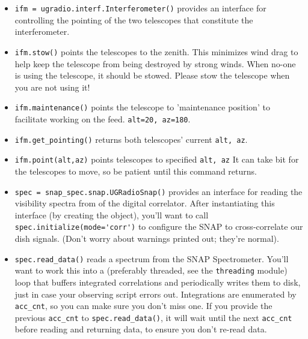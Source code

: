 \documentclass[11pt,preprint]{aastex}
\begin{document}
\begin{itemize}
\item \verb+ifm = ugradio.interf.Interferometer()+ provides an interface for controlling 
the pointing of the two telescopes that constitute the interferometer.

\item \verb+ifm.stow()+ points the telescopes to the zenith. This minimizes 
wind drag to help keep the telescope from being destroyed by strong winds. 
When no-one is using the telescope, it should be stowed.  Please stow the
 telescope when you are not using it!

\item \verb+ifm.maintenance()+ points the telescope to 'maintenance position' to 
facilitate working on the feed. \verb+alt=20, az=180+.

\item \verb+ifm.get_pointing()+ returns both telescopes' current \verb+alt, az+.

\item \verb+ifm.point(alt,az)+ points telescopes to specified \verb+alt, az+
It can take bit for the telescopes to move, so be patient until this
command returns.

\item \verb+spec = snap_spec.snap.UGRadioSnap()+ provides an interface for reading
the visibility spectra from of the digital correlator. After instantiating this
interface (by creating the object), you'll want to call \verb+spec.initialize(mode='corr')+
to configure the SNAP to cross-correlate our dish signals. (Don't worry about
warnings printed out; they're normal).

\item \verb+spec.read_data()+ reads a spectrum from the SNAP Spectrometer. You'll
want to work this into a (preferably threaded, see the {\tt threading} module)
loop that buffers integrated correlations and periodically writes them to disk,
just in case your observing script errors out. Integrations are enumerated by {\tt acc\_cnt},
so you can make sure you don't miss one. If you provide the previous {\tt acc\_cnt} to
\verb+spec.read_data()+, it will wait until the next {\tt acc\_cnt} before reading and returning
data, to ensure you don't re-read data.




\end{itemize}
\end{document}
